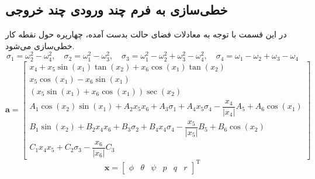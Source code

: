 \subsection{خطی‌سازی به فرم چند ورودی چند خروجی}\label{lin_MIMO}
در این قسمت با توجه به معادلات فضای حالت بدست آمده، چهارپره حول نقطه کار خطی‌سازی می‌شود.
\begin{equation*}
	\sigma_1 = \omega_2^2-\omega_4^2,\quad \sigma_2 = \omega_1^2-\omega_3^2,
	\quad \sigma_3 = \omega_1^2-\omega_2^2+\omega_3^2-\omega_4^2,\quad \sigma_4 = \omega_1-\omega_2+\omega_3-\omega_4
\end{equation*}
\begin{equation*}
		\boldsymbol a = \begin{bmatrix}
		x_4 + x_5\sin(x_1)\tan(x_2) + x_6\cos(x_1)\tan(x_2)\\
		x_5\cos(x_1)- x_6\sin(x_1)\\
		(x_5\sin(x_1) + x_6\cos(x_1))\sec(x_2)\\
		A_1\cos(x_2)\sin(x_1) + 
		A_2x_5x_6 + A_3\sigma_1+
		A_4x_5\sigma_4- \dfrac{x_4}{\lvert x_4\rvert}A_5+A_6\cos(x_1)\\
		B_1\sin(x_2) + 
		B_2x_4x_6 + B_3\sigma_2+
		B_4x_4\sigma_4- \dfrac{x_5}{\lvert x_5\rvert}B_5 + B_6\cos(x_2)\\
		C_1x_4x_5 + 
		C_2\sigma_3- \dfrac{x_6}{\lvert x_6\rvert}C_3
	\end{bmatrix}
\end{equation*} 
\begin{equation}
	\boldsymbol{x} = \begin{bmatrix} %
		\phi& \theta & \psi & p& q& r
	\end{bmatrix}^\mathrm{T}
\end{equation}
